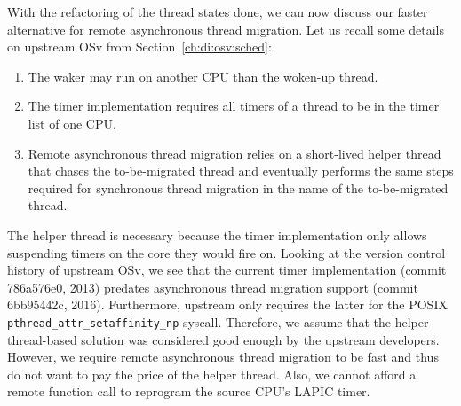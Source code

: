 \documentclass[12pt,a4paper]{book}
\begin{document}
With the refactoring of the thread states done, we can now discuss our faster alternative for remote asynchronous thread migration.
Let us recall some details on upstream OSv from Section~\ref{ch:di:osv:sched}:
\begin{enumerate}[label=(\alph*)]
    \item The waker may run on another CPU than the woken-up thread.
    \item The timer implementation requires all timers of a thread to be in the timer list of one CPU.
    \item Remote asynchronous thread migration relies on a short-lived helper thread that chases the to-be-migrated thread and eventually performs the same steps required for synchronous thread migration in the name of the to-be-migrated thread.
\end{enumerate}
The helper thread is necessary because the timer implementation only allows suspending timers on the core they would fire on.
Looking at the version control history of upstream OSv, we see that the current timer implementation (commit 786a576e0, 2013) predates asynchronous thread migration support (commit 6bb95442c, 2016).
Furthermore, upstream only requires the latter for the POSIX \lstinline[style=figurecpp]{pthread_attr_setaffinity_np} syscall.
Therefore, we assume that the helper-thread-based solution was considered good enough by the upstream developers.
However, we require remote asynchronous thread migration to be fast and thus do not want to pay the price of the helper thread.
Also, we cannot afford a remote function call to reprogram the source CPU's LAPIC timer.
\end{document}
